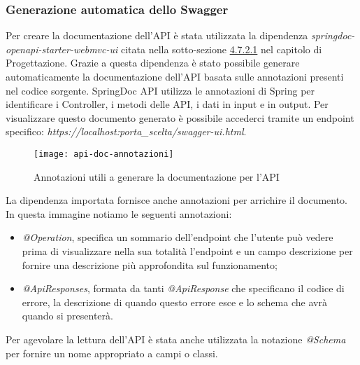 \subsubsection{Generazione automatica dello Swagger}
Per creare la documentazione dell'API è stata utilizzata la dipendenza \textit{springdoc-openapi-starter-webmvc-ui} citata nella sotto-sezione \hyperlink{doc-api}{4.7.2.1} nel capitolo di Progettazione. Grazie a questa dipendenza è stato possibile generare automaticamente la documentazione dell'API basata sulle annotazioni presenti nel codice sorgente. SpringDoc API utilizza le annotazioni di Spring per identificare i Controller, i metodi delle API, i dati in input e in output. Per visualizzare questo documento generato è possibile accederci tramite un endpoint specifico: \textit{https://localhost:porta\_scelta/swagger-ui.html}.
\begin{figure}[H] 
    \centering 
    \texttt{[image: api-doc-annotazioni]} 
    \caption{Annotazioni utili a generare la documentazione per l'API}
\end{figure}
\noindent La dipendenza importata fornisce anche annotazioni per arrichire il documento. In questa immagine notiamo le seguenti annotazioni:
\begin{itemize}
\item \textit{@Operation}, specifica un sommario dell'endpoint che l'utente può vedere prima di visualizzare nella sua totalità l'endpoint e un campo descrizione per fornire una descrizione più approfondita sul funzionamento;
\item \textit{@ApiResponses}, formata da tanti \textit{@ApiResponse} che specificano il codice di errore, la descrizione di quando questo errore esce e lo schema che avrà quando si presenterà.
\end{itemize}
Per agevolare la lettura dell'API è stata anche utilizzata la notazione \textit{@Schema} per fornire un nome appropriato a campi o classi.






